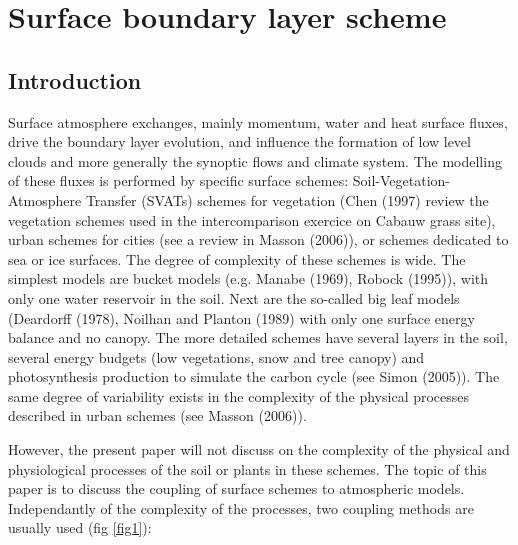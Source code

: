 
\chapter{Surface boundary layer scheme}\label{SBL}
\minitoc



\section{Introduction}

Surface atmosphere exchanges, mainly momentum, water and heat surface fluxes, drive the boundary layer evolution, and influence the formation of low level clouds and more generally the synoptic flows and climate system. The modelling of these fluxes is performed by specific surface schemes: Soil-Vegetation-Atmosphere Transfer (SVATs) schemes for vegetation (Chen \etal (1997)\nocite{Chen1997} review the vegetation schemes used in the intercomparison exercice on Cabauw grass site), urban schemes for cities (see a review in Masson (2006)\nocite{Masson2006}), or schemes dedicated to sea or ice surfaces. The degree of complexity of these schemes is wide. The simplest models are bucket models (e.g. Manabe (1969)\nocite{Manabe1969}, Robock \etal (1995)\nocite{Robock1995}), with only one water reservoir in the soil. Next are the so-called big leaf models (Deardorff (1978), Noilhan and Planton (1989)\nocite{Noilhan1989} with only one surface energy balance and no canopy. The more detailed schemes have several layers in the soil, several energy budgets (low vegetations, snow and tree canopy) and photosynthesis production to simulate the carbon cycle (see Simon \etal (2005)\nocite{Simon2005}). The same degree of variability exists in the complexity of the physical processes described in urban schemes (see Masson (2006)).

However, the present paper will not discuss on the complexity of the physical and physiological processes of the soil or plants in these schemes. The topic of this paper is to discuss the coupling of surface schemes to atmospheric models. Independantly of the complexity of the processes, two coupling methods are usually used (fig \ref{fig1}):

